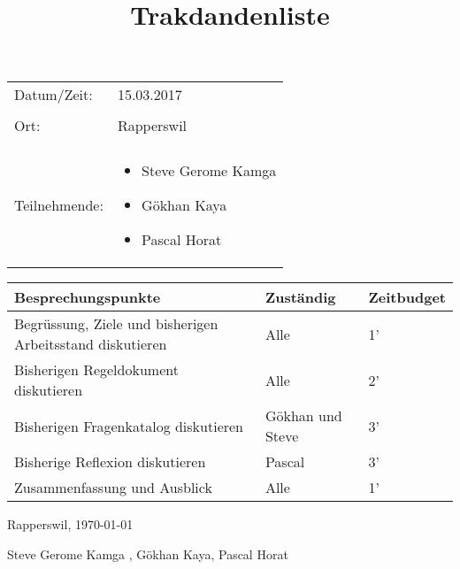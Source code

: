 \documentclass[10pt]{article}
\title{Trakdandenliste}
\date{}             %
\begin{document}
\maketitle




\begin{tabular}{l p{5cm}}


Datum/Zeit: & 15.03.2017 \\ \\

Ort: & Rapperswil \\ \\
Teilnehmende: & \begin{itemize} \item Steve Gerome Kamga \item Gökhan Kaya \item Pascal Horat \end{itemize}

\end{tabular}

\vspace{1cm}

\begin{tabular}{|l|l|l|}
\hline
\textbf{Besprechungspunkte} & \textbf{Zuständig} & \textbf{Zeitbudget} \\ \hline
Begrüssung, Ziele und bisherigen Arbeitsstand diskutieren& Alle & 1' \\ \hline
Bisherigen Regeldokument diskutieren & Alle & 2' \\ \hline
Bisherigen Fragenkatalog diskutieren & Gökhan und Steve & 3' \\ \hline
Bisherige Reflexion diskutieren & Pascal & 3' \\ \hline
Zusammenfassung und Ausblick & Alle & 1' \\ \hline

\end{tabular}

\vspace{1cm}

Rapperswil, \today

\vspace{1cm}

Steve Gerome Kamga , Gökhan Kaya, Pascal Horat
\end{document}
